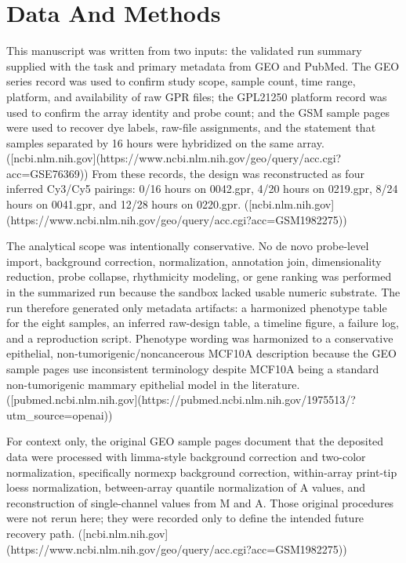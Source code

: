\documentclass[11pt]{article}
\begin{document}
\section{Data And Methods}
This manuscript was written from two inputs: the validated run summary supplied with the task and primary metadata from GEO and PubMed. The GEO series record was used to confirm study scope, sample count, time range, platform, and availability of raw GPR files; the GPL21250 platform record was used to confirm the array identity and probe count; and the GSM sample pages were used to recover dye labels, raw-file assignments, and the statement that samples separated by 16 hours were hybridized on the same array. ([ncbi.nlm.nih.gov](https://www.ncbi.nlm.nih.gov/geo/query/acc.cgi?acc=GSE76369)) From these records, the design was reconstructed as four inferred Cy3/Cy5 pairings: 0/16 hours on 0042.gpr, 4/20 hours on 0219.gpr, 8/24 hours on 0041.gpr, and 12/28 hours on 0220.gpr. ([ncbi.nlm.nih.gov](https://www.ncbi.nlm.nih.gov/geo/query/acc.cgi?acc=GSM1982275))

The analytical scope was intentionally conservative. No de novo probe-level import, background correction, normalization, annotation join, dimensionality reduction, probe collapse, rhythmicity modeling, or gene ranking was performed in the summarized run because the sandbox lacked usable numeric substrate. The run therefore generated only metadata artifacts: a harmonized phenotype table for the eight samples, an inferred raw-design table, a timeline figure, a failure log, and a reproduction script. Phenotype wording was harmonized to a conservative epithelial, non-tumorigenic/noncancerous MCF10A description because the GEO sample pages use inconsistent terminology despite MCF10A being a standard non-tumorigenic mammary epithelial model in the literature. ([pubmed.ncbi.nlm.nih.gov](https://pubmed.ncbi.nlm.nih.gov/1975513/?utm\_source=openai))

For context only, the original GEO sample pages document that the deposited data were processed with limma-style background correction and two-color normalization, specifically normexp background correction, within-array print-tip loess normalization, between-array quantile normalization of A values, and reconstruction of single-channel values from M and A. Those original procedures were not rerun here; they were recorded only to define the intended future recovery path. ([ncbi.nlm.nih.gov](https://www.ncbi.nlm.nih.gov/geo/query/acc.cgi?acc=GSM1982275))
\end{document}
